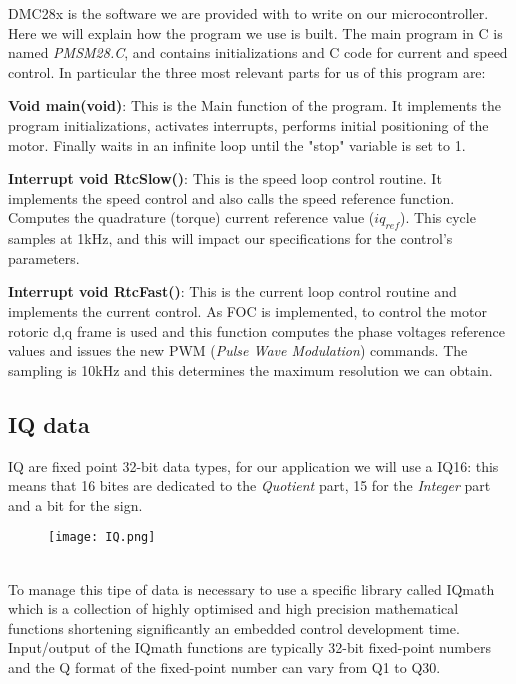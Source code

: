 \documentclass[12pt]{article}
\begin{document}
DMC28x is the software we are provided with to write on our microcontroller. Here we will explain how the program we use is built. 
The main program in C is named \textit{PMSM28.C}, and contains initializations and C code for current and speed control. 
In particular the three most relevant parts for us of this program are:

\textbf{Void main(void)}:
This is the Main function of the program. It implements the program initializations, activates interrupts, performs initial positioning of the motor. Finally waits in an infinite loop until the "stop" variable is set to 1.

\textbf{Interrupt void RtcSlow()}:
This is the speed loop control routine.
It implements the speed control and also calls the speed reference function. Computes the quadrature (torque)
current reference value ($iq_{ref}$).
This cycle samples at 1kHz, and this will impact our specifications for the control's parameters.

\textbf{Interrupt void RtcFast()}:
This is the current loop control routine and implements the current control. As FOC is implemented, to control the motor rotoric d,q frame is used and this function computes the phase voltages reference values and issues the new PWM (\textit{Pulse Wave Modulation}) commands. The sampling is 10kHz and this determines the maximum resolution we can obtain. 

\subsection{IQ data}

IQ are fixed point 32-bit data types, for our application we will use a IQ16: this means that 16 bites are dedicated to the \textit{Quotient} part, 15 for the \textit{Integer} part and a bit for the sign.
\begin{figure}[h]
\centering
\texttt{[image: IQ.png]}
\end{figure}\\  
To manage this tipe of data is necessary to use a specific library called IQmath which is a collection of highly
optimised and high precision mathematical functions shortening significantly an embedded control development time. 
Input/output of the IQmath functions are typically 32-bit fixed-point numbers and the Q format of
the fixed-point number can vary from Q1 to Q30.
\end{document}
